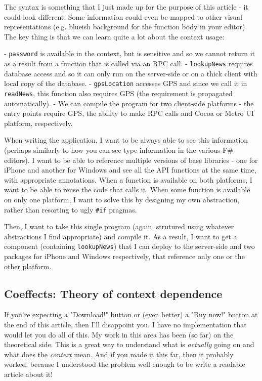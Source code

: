 The syntax is something that I just made up for the purpose of this article - it could
look different. Some information could even be mapped to other visual representations
(e.g. blueish background for the function body in your editor). The key thing is that
we can learn quite a lot about the context usage:

 - \texttt{password} is available in the context, but is sensitive and so we cannot return it
   as a result from a function that is called via an RPC call.
 - \texttt{lookupNews} requires database access and so it can only run on the server-side
   or on a thick client with local copy of the database.
 - \texttt{gpsLocation} accesses GPS and since we call it in \texttt{readNews}, this function
   also requires GPS (the requirement is propagated automatically).
 - We can compile the program for two client-side platforms - the entry points require
   GPS, the ability to make RPC calls and Cocoa or Metro UI platform, respectively.

When writing the application, I want to be always able to see this information (perhaps
similarly to how you can see type information in the various F\# editors). I want to be
able to reference multiple versions of base libraries - one for iPhone and another for
Windows and see all the API functions at the same time, with appropriate annotations.
When a function is available on both platforms, I want to be able to reuse the code that
calls it. When some function is available on only one platform, I want to solve this by
designing my own abstraction, rather than resorting to ugly \texttt{\#if} pragmas.

Then, I want to take this single program (again, strutured using whatever abstractions
I find appropriate) and compile it. As a result, I want to get a component (containing
\texttt{lookupNews}) that I can deploy to the server-side and two packages for iPhone and 
Windows respectively, that reference only one or the other platform.


\subsection{Coeffects: Theory of context dependence}

If you're expecting a "Download!" button or (even better) a "Buy now!" button at the end of this article,
then I'll disappoint you. I have no implementation that would let you do all of this.
My work in this area has been (so far) on the theoretical side. This is a great way to 
understand what is \emph{actually} going on and what does the \emph{context} mean. And if you made
it this far, then it probably worked, because I understood the problem well enough to be 
write a readable article about it!

